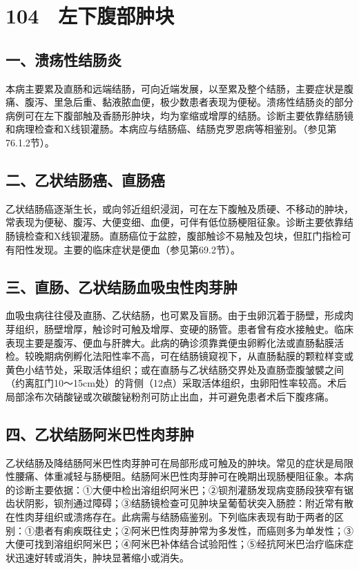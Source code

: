 \section{104　左下腹部肿块}

\subsection{一、溃疡性结肠炎}

本病主要累及直肠和远端结肠，可向近端发展，以至累及整个结肠，主要症状是腹痛、腹泻、里急后重、黏液脓血便，极少数患者表现为便秘。溃疡性结肠炎的部分病例可在左下腹部触及香肠形肿块，均为挛缩或增厚的结肠。诊断主要依靠结肠镜和病理检查和X线钡灌肠。本病应与结肠癌、结肠克罗恩病等相鉴别。（参见第76.1.2节）。

\subsection{二、乙状结肠癌、直肠癌}

乙状结肠癌逐渐生长，或向邻近组织浸润，可在左下腹触及质硬、不移动的肿块，常表现为便秘、腹泻、大便变细、血便，可伴有低位肠梗阻征象。诊断主要依靠结肠镜检查和X线钡灌肠。直肠癌位于盆腔，腹部触诊不易触及包块，但肛门指检可有阳性发现。主要的临床症状是便血（参见第69.2节）。

\subsection{三、直肠、乙状结肠血吸虫性肉芽肿}

血吸虫病往往侵及直肠、乙状结肠，也可累及盲肠。由于虫卵沉着于肠壁，形成肉芽组织，肠壁增厚，触诊时可触及增厚、变硬的肠管。患者曾有疫水接触史。临床表现主要是腹泻、便血与肝脾大。此病的确诊须靠粪便虫卵孵化法或直肠黏膜活检。较晚期病例孵化法阳性率不高，可在结肠镜窥视下，从直肠黏膜的颗粒样变或黄色小结节处，采取活体组织；或在直肠与乙状结肠交界处及直肠壶腹皱襞之间（约离肛门10～15cm处）的背侧（12点）采取活体组织，虫卵阳性率较高。术后局部涂布次硝酸铋或次碳酸铋粉剂可防止出血，并可避免患者术后下腹疼痛。

\subsection{四、乙状结肠阿米巴性肉芽肿}

乙状结肠及降结肠阿米巴性肉芽肿可在局部形成可触及的肿块。常见的症状是局限性腰痛、体重减轻与肠梗阻。结肠阿米巴性肉芽肿可在晚期出现肠梗阻征象。本病的诊断主要依据：①大便中检出溶组织阿米巴；②钡剂灌肠发现病变肠段狭窄有锯齿状阴影，钡剂通过障碍；③结肠镜检查可见肿块呈葡萄状突入肠腔：附近常有散在性肉芽组织或溃疡存在。此病需与结肠癌鉴别。下列临床表现有助于两者的区别：①患者有痢疾既往史；②阿米巴性肉芽肿常为多发性，而癌则多为单发性；③大便可找到溶组织阿米巴；④阿米巴补体结合试验阳性；⑤经抗阿米巴治疗临床症状迅速好转或消失，肿块显著缩小或消失。

